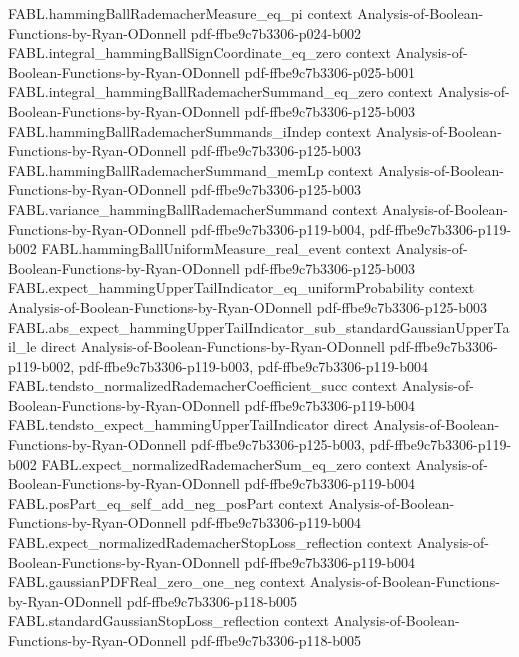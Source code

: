 \begin{theorem}
\proofstep
  {FABL.hammingBallRademacherMeasure_eq_pi}
  {context}
  {Analysis-of-Boolean-Functions-by-Ryan-ODonnell}
  {pdf-ffbe9c7b3306-p024-b002}
\proofstep
  {FABL.integral_hammingBallSignCoordinate_eq_zero}
  {context}
  {Analysis-of-Boolean-Functions-by-Ryan-ODonnell}
  {pdf-ffbe9c7b3306-p025-b001}
\proofstep
  {FABL.integral_hammingBallRademacherSummand_eq_zero}
  {context}
  {Analysis-of-Boolean-Functions-by-Ryan-ODonnell}
  {pdf-ffbe9c7b3306-p125-b003}
\proofstep
  {FABL.hammingBallRademacherSummands_iIndep}
  {context}
  {Analysis-of-Boolean-Functions-by-Ryan-ODonnell}
  {pdf-ffbe9c7b3306-p125-b003}
\proofstep
  {FABL.hammingBallRademacherSummand_memLp}
  {context}
  {Analysis-of-Boolean-Functions-by-Ryan-ODonnell}
  {pdf-ffbe9c7b3306-p125-b003}
\proofstep
  {FABL.variance_hammingBallRademacherSummand}
  {context}
  {Analysis-of-Boolean-Functions-by-Ryan-ODonnell}
  {pdf-ffbe9c7b3306-p119-b004,
    pdf-ffbe9c7b3306-p119-b002}
\proofstep
  {FABL.hammingBallUniformMeasure_real_event}
  {context}
  {Analysis-of-Boolean-Functions-by-Ryan-ODonnell}
  {pdf-ffbe9c7b3306-p125-b003}
\proofstep
  {FABL.expect_hammingUpperTailIndicator_eq_uniformProbability}
  {context}
  {Analysis-of-Boolean-Functions-by-Ryan-ODonnell}
  {pdf-ffbe9c7b3306-p125-b003}
\proofstep
  {FABL.abs_expect_hammingUpperTailIndicator_sub_standardGaussianUpperTail_le}
  {direct}
  {Analysis-of-Boolean-Functions-by-Ryan-ODonnell}
  {pdf-ffbe9c7b3306-p119-b002,
    pdf-ffbe9c7b3306-p119-b003,
    pdf-ffbe9c7b3306-p119-b004}
\proofstep
  {FABL.tendsto_normalizedRademacherCoefficient_succ}
  {context}
  {Analysis-of-Boolean-Functions-by-Ryan-ODonnell}
  {pdf-ffbe9c7b3306-p119-b004}
\proofstep
  {FABL.tendsto_expect_hammingUpperTailIndicator}
  {direct}
  {Analysis-of-Boolean-Functions-by-Ryan-ODonnell}
  {pdf-ffbe9c7b3306-p125-b003,
    pdf-ffbe9c7b3306-p119-b002}
\proofstep
  {FABL.expect_normalizedRademacherSum_eq_zero}
  {context}
  {Analysis-of-Boolean-Functions-by-Ryan-ODonnell}
  {pdf-ffbe9c7b3306-p119-b004}
\proofstep
  {FABL.posPart_eq_self_add_neg_posPart}
  {context}
  {Analysis-of-Boolean-Functions-by-Ryan-ODonnell}
  {pdf-ffbe9c7b3306-p119-b004}
\proofstep
  {FABL.expect_normalizedRademacherStopLoss_reflection}
  {context}
  {Analysis-of-Boolean-Functions-by-Ryan-ODonnell}
  {pdf-ffbe9c7b3306-p119-b004}
\proofstep
  {FABL.gaussianPDFReal_zero_one_neg}
  {context}
  {Analysis-of-Boolean-Functions-by-Ryan-ODonnell}
  {pdf-ffbe9c7b3306-p118-b005}
\proofstep
  {FABL.standardGaussianStopLoss_reflection}
  {context}
  {Analysis-of-Boolean-Functions-by-Ryan-ODonnell}
  {pdf-ffbe9c7b3306-p118-b005}

\end{theorem}
